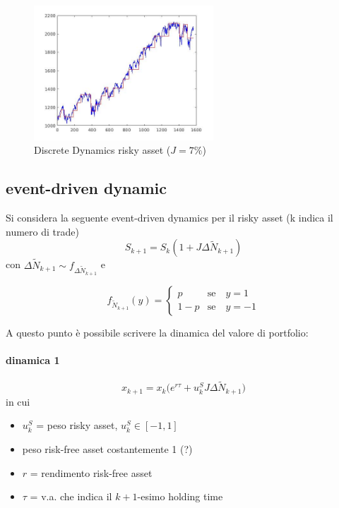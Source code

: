 \documentclass[12pt,a4paper]{article}
\theoremstyle{break}
\begin{document}
\begin{figure}[H]
	\caption{Discrete Dynamics risky asset ($J = 7\% $)}
	\centering
	\includegraphics[width=0.6\textwidth]{DiscreteDynamics.png}
\end{figure}

\subsection{event-driven dynamic}
Si considera la seguente event-driven dynamics per il risky asset (k indica il numero di trade)
\begin{equation}
  S_{k+1} = S_{k} (1 + J\Delta \widetilde{N}_{k+1})
\end{equation}
con 
$\Delta \widetilde{N}_{k+1} \sim f_{\Delta \widetilde{N}_{k+1}}$ e

\[
f_{\widetilde{N}_{k+1}}(y) = 
\begin{cases}
p & \text{se} \quad y = 1 \\
1 - p & \text{se} \quad y = -1 
\end{cases}
\]

A questo punto è possibile scrivere la dinamica del valore di portfolio:
\paragraph{dinamica 1} 
\begin{equation} \label{eq:dinamica1}
x_{k+1} = x_k\Big(e^{r \tau} + u^{S}_k J \Delta \widetilde{N}_{k+1}  \Big)
\end{equation}
in cui 
\begin{itemize}
	\item $u^{S}_k$ = peso risky asset, $u^{S}_k \in [-1,1]$
	\item peso risk-free asset costantemente 1 (?)
	\item $r$ = rendimento risk-free asset
	\item $\tau$ =  v.a. che indica il $k+1$-esimo holding time
\end{itemize}
\end{document}
